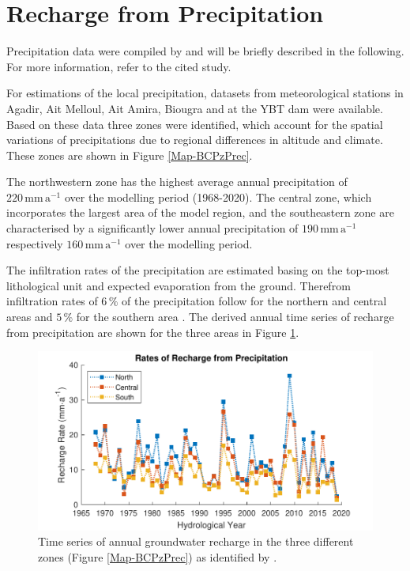 
\section{Recharge from Precipitation}
\label{Sec-PrecRech}

Precipitation data were compiled by \textcite{Horn.2021} and will be briefly described in the following. 
For more information, refer to the cited study.
    
For estimations of the local precipitation, datasets from meteorological stations in Agadir, Ait Melloul, Ait Amira, Biougra and at the YBT dam were available. 
Based on these data three zones were identified, which account for the spatial variations of precipitations due to regional differences in altitude and climate. 
These zones are shown in Figure \ref{Map-BCPzPrec}.
    
    
The northwestern zone has the highest average annual precipitation of \linebreak $220 \, \textrm{mm} \, \textrm{a}^{-1}$ over the modelling period (1968-2020). 
The central zone, which incorporates the largest area of the model region, and the southeastern zone are characterised by a significantly lower annual precipitation of $190 \, \textrm{mm} \, \textrm{a}^{-1}$ respectively $160 \, \textrm{mm} \, \textrm{a}^{-1}$ over the modelling period.

The infiltration rates of the precipitation are estimated basing on the top-most lithological unit and expected evaporation from the ground. 
Therefrom infiltration rates of $6 \, \%$ of the precipitation follow for the northern and central areas and $5 \, \%$ for the southern area \parencite{Resing.2008}. 
The derived annual time series of recharge from precipitation are shown for the three areas in Figure \ref{Fig-RechPrec}.

\begin{figure}[h]
    \centering
    \includegraphics{./img/Fig-PrecRecharge.pdf}
    \caption{Time series of annual groundwater recharge in the three different zones (Figure \ref{Map-BCPzPrec}) as identified by \cite{Horn.2021}.}
    \label{Fig-RechPrec}
\end{figure}

